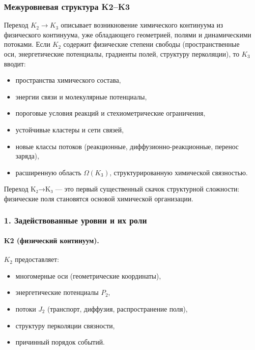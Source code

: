 
\subsubsection{Межуровневая структура K2–K3}
\label{sec:crossk-k2-k3}

Переход $K_2 \rightarrow K_3$ описывает возникновение химического
континуума из физического континуума, уже обладающего геометрией, полями и
динамическими потоками. Если $K_2$ содержит физические степени свободы
(пространственные оси, энергетические потенциалы, градиенты полей, структуру
перколяции), то $K_3$ вводит:
\begin{itemize}
  \item пространства химического состава,
  \item энергии связи и молекулярные потенциалы,
  \item пороговые условия реакций и стехиометрические ограничения,
  \item устойчивые кластеры и сети связей,
  \item новые классы потоков (реакционные, диффузионно-реакционные,
        перенос заряда),
  \item расширенную область $\Omega(K_3)$, структурированную химической
        связностью.
\end{itemize}

Переход K₂→K₃ — это первый существенный скачок структурной сложности:
физические поля становятся основой химической организации.

\subsubsection{1. Задействованные уровни и их роли}

\paragraph{K2 (физический континуум).}
$K_2$ предоставляет:
\begin{itemize}
  \item многомерные оси (геометрические координаты),
  \item энергетические потенциалы $P_2$,
  \item потоки $J_2$ (транспорт, диффузия, распространение поля),
  \item структуру перколяции связности,
  \item причинный порядок событий.
\end{itemize}

